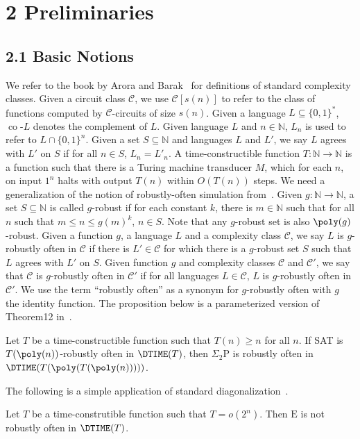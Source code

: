\section*{2 Preliminaries}
\subsection*{2.1 Basic Notions}
We refer to the book by Arora and Barak~\cite{ref9} for definitions of standard complexity classes.
Given a circuit class $\mathcal C$, we use $\mathcal C[s(n)]$ to refer to the class of functions computed by $\mathcal C$-circuits of size $s(n)$.
Given a language $L\subseteq\{0,1\}^*$, $\operatorname{co}\text{-}L$ denotes the complement of $L$. Given language $L$ and $n\in\mathbb N$, $L_n$ is used to refer to $L\cap\{0,1\}^n$.
Given a set $S\subseteq\mathbb N$ and languages $L$ and $L'$, we say $L$ agrees with $L'$ on $S$ if for all $n\in S$, $L_n=L'_n$.
A time-constructible function $T:\mathbb N\to\mathbb N$ is a function such that there is a Turing machine transducer $M$, which for each $n$, on input $1^n$ halts with output $T(n)$ within $O(T(n))$ steps.
We need a generalization of the notion of robustly-often simulation from~\cite{ref11}. Given $g:\mathbb N\to\mathbb N$, a set $S\subseteq\mathbb N$ is called $g$-robust if for each constant $k$, there is $m\in\mathbb N$ such that for all $n$ such that $m\leq n\leq g(m)^k$, $n\in S$. Note that any $g$-robust set is also $\poly(g)$-robust.
Given a function $g$, a language $L$ and a complexity class $\mathcal C$, we say $L$ is $g$-robustly often in $\mathcal C$ if there is $L'\in\mathcal C$ for which there is a $g$-robust set $S$ such that $L$ agrees with $L'$ on $S$. Given function $g$ and complexity classes $\mathcal C$ and $\mathcal C'$, we say that $\mathcal C$ is $g$-robustly often in $\mathcal C'$ if for all languages $L\in\mathcal C$, $L$ is $g$-robustly often in $\mathcal C'$. We use the term ``robustly often'' as a synonym for $g$-robustly often with $g$ the identity function.
The proposition below is a parameterized version of Theorem12 in~\cite{ref11}.
\setcounter{nttheorem}{2}
\begin{ntproposition}
Let $T$ be a time-constructible function such that $T(n)\geq n$ for all $n$. If SAT is $T(\poly(n))$-robustly often in $\DTIME(T)$, then $\Sigma_2\mathrm P$ is robustly often in $\DTIME(T(\poly(T(\poly(n)))))$.
\end{ntproposition}
The following is a simple application of standard diagonalization~\cite{ref13}.
\begin{ntproposition}
Let $T$ be a time-construtible function such that $T=o(2^n)$. Then $\mathrm E$ is not robustly often in $\DTIME(T)$.
\end{ntproposition}
